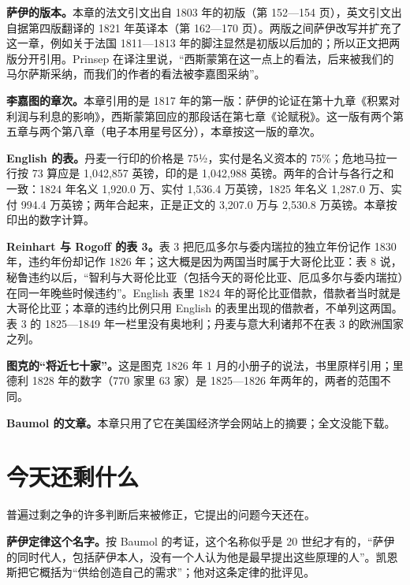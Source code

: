 \begin{deeper}[版本与史料的出入]
\textbf{萨伊的版本。}本章的法文引文出自 1803 年的初版（第 152—154 页），英文引文出自据第四版翻译的 1821 年英译本（第 162—170 页）。两版之间萨伊改写并扩充了这一章，例如关于法国 1811—1813 年的脚注显然是初版以后加的；所以正文把两版分开引用\cite{say1803,say1821}。Prinsep 在译注里说，“西斯蒙第在这一点上的看法，后来被我们的马尔萨斯采纳，而我们的作者的看法被李嘉图采纳”\cite{say1821}。

\textbf{李嘉图的章次。}本章引用的是 1817 年的第一版：萨伊的论证在第十九章《积累对利润与利息的影响》，西斯蒙第回应的那段话在第七章《论赋税》。这一版有两个第五章与两个第八章（电子本用星号区分），本章按这一版的章次\cite{ricardo1817}。

\textbf{English 的表。}丹麦一行印的价格是 75½，实付是名义资本的 75\%；危地马拉一行按 73 算应是 1,042,857 英镑，印的是 1,042,988 英镑。两年的合计与各行之和一致：1824 年名义 1,920.0 万、实付 1,536.4 万英镑，1825 年名义 1,287.0 万、实付 994.4 万英镑；两年合起来，正是正文的 3,207.0 万与 2,530.8 万英镑\cite{english1827}。本章按印出的数字计算。

\textbf{Reinhart 与 Rogoff 的表 3。}表 3 把厄瓜多尔与委内瑞拉的独立年份记作 1830 年，违约年份却记作 1826 年；这大概是因为两国当时属于大哥伦比亚：表 8 说，秘鲁违约以后，“智利与大哥伦比亚（包括今天的哥伦比亚、厄瓜多尔与委内瑞拉）在同一年晚些时候违约”。English 表里 1824 年的哥伦比亚借款，借款者当时就是大哥伦比亚；本章的违约比例只用 English 的表里出现的借款者，不单列这两国。表 3 的 1825—1849 年一栏里没有奥地利；丹麦与意大利诸邦不在表 3 的欧洲国家之列\cite{reinhart2008tid}。

\textbf{图克的“将近七十家”。}这是图克 1826 年 1 月的小册子的说法，书里原样引用；里德利 1828 年的数字（770 家里 63 家）是 1825—1826 年两年的，两者的范围不同\cite{tooke1838v2}。

\textbf{Baumol 的文章。}本章只用了它在美国经济学会网站上的摘要；全文没能下载\cite{baumol1999}。
\end{deeper}

\section{今天还剩什么}\label{sec:say-legacy}

普遍过剩之争的许多判断后来被修正，它提出的问题今天还在。

\textbf{萨伊定律这个名字。}按 Baumol 的考证，这个名称似乎是 20 世纪才有的，“萨伊的同时代人，包括萨伊本人，没有一个人认为他是最早提出这些原理的人”\cite{baumol1999}。凯恩斯把它概括为“供给创造自己的需求”；他对这条定律的批评见。

